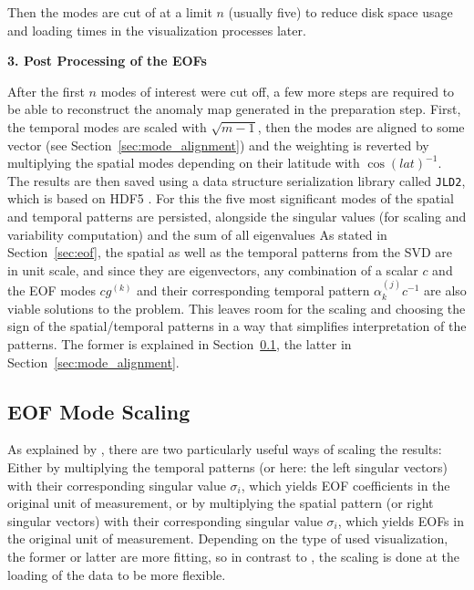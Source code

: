 Then the modes are cut of at a limit $n$ (usually five) to reduce disk space usage and loading times in the visualization processes later. 


\textbf{3. Post Processing of the EOFs}

After the first $n$ modes of interest were cut off, a few more steps are required to be able to reconstruct the anomaly map generated in the preparation step.  
First, the temporal modes are scaled with $\sqrt{m-1}$, then the modes are aligned to some vector (see Section~\ref{sec:mode_alignment}) and the weighting is reverted by multiplying the spatial modes depending on their latitude with $\cos(lat)^{-1}$.
The results are then saved using a data structure serialization library called \texttt{JLD2}, which is based on HDF5 \cite{noauthor_juliaiojld2jl_2024}. 
For this the five most significant modes of the spatial and temporal patterns are persisted, alongside the singular values (for scaling and variability computation) and the sum of all eigenvalues
As stated in Section~\ref{sec:eof}, the spatial as well as the temporal patterns from the SVD are in unit scale, and since they are eigenvectors, any combination of a scalar $c$ and the EOF modes $cg^{(k)}$ and their corresponding temporal pattern $\alpha^{(j)}_k c^{-1}$ are also viable solutions to the problem. 
This leaves room for the scaling and choosing the sign of the spatial/temporal patterns in a way that simplifies interpretation of the patterns. 
The former is explained in Section~\ref{sec:mode_scaling}, the latter  in Section~\ref{sec:mode_alignment}.

\subsection{EOF Mode Scaling}
\label{sec:mode_scaling}

As explained by , there are two particularly useful ways of scaling the results: 
Either by multiplying the temporal patterns (or here: the left singular vectors) with their corresponding singular value $\sigma_i$, which yields EOF coefficients in the original unit of measurement, or by multiplying the spatial pattern (or right singular vectors) with their corresponding singular value $\sigma_i$, which yields EOFs in the original unit of measurement. 
Depending on the type of used visualization, the former or latter are more fitting, so in contrast to \cite{vietinghoffdiss}, the scaling is done at the loading of the data to be more flexible.

